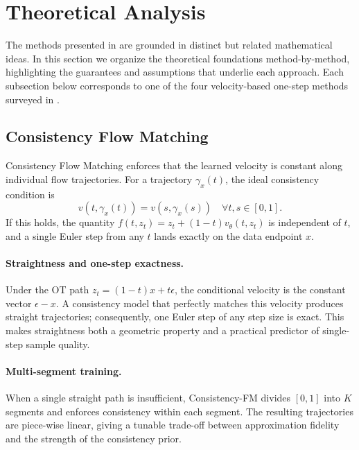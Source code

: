 \section{Theoretical Analysis}
\label{sec:theory}

The methods presented in  are grounded in distinct but related mathematical ideas. In this section we organize the theoretical foundations method-by-method, highlighting the guarantees and assumptions that underlie each approach. Each subsection below corresponds to one of the four velocity-based one-step methods surveyed in .

\subsection{Consistency Flow Matching}
\label{subsec:theory-cfm}

Consistency Flow Matching enforces that the learned velocity is constant along individual flow trajectories. For a trajectory $\gamma_x(t)$, the ideal consistency condition is
\begin{equation}
    v(t, \gamma_x(t)) = v(s, \gamma_x(s)) \quad \forall t, s \in [0,1].
\end{equation}
If this holds, the quantity $f(t, z_t) = z_t + (1-t) v_\theta(t, z_t)$ is independent of $t$, and a single Euler step from any $t$ lands exactly on the data endpoint $x$.

\paragraph{Straightness and one-step exactness.} Under the OT path $z_t = (1-t)x + t\epsilon$, the conditional velocity is the constant vector $\epsilon - x$. A consistency model that perfectly matches this velocity produces straight trajectories; consequently, one Euler step of any step size is exact. This makes straightness both a geometric property and a practical predictor of single-step sample quality.

\paragraph{Multi-segment training.} When a single straight path is insufficient, Consistency-FM divides $[0,1]$ into $K$ segments and enforces consistency within each segment. The resulting trajectories are piece-wise linear, giving a tunable trade-off between approximation fidelity and the strength of the consistency prior.

